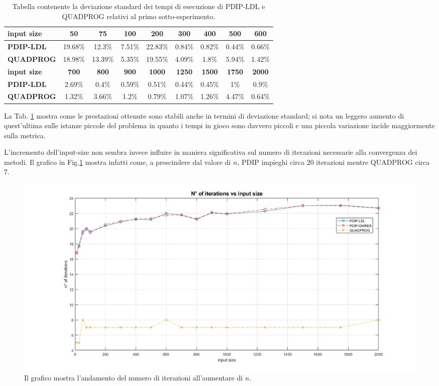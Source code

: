     
\begin{table}[!h]
\centering
\begin{tabular}{|l|c|c|c|c|c|c|c|c|}\hline
\textbf{input size} & \textbf{50}  & \textbf{75}  & \textbf{100} & \textbf{200}  & \textbf{300}  & \textbf{400}  & \textbf{500}  & \textbf{600}  \\\hline
\textbf{PDIP-LDL}   & 19.68\%      & 12.3\%      & 7.51\%      & 22.83\%        & 0.84\%        & 0.82\%        & 0.44\%        & 0.66\%        \\
\textbf{QUADPROG}   & 18.98\%      & 13.39\%      & 5.35\%      & 19.55\%        & 4.09\%        & 1.8\%        & 5.94\%       & 1.42\%        \\\hline
\textbf{input size} & \textbf{700} & \textbf{800} & \textbf{900} & \textbf{1000} & \textbf{1250} & \textbf{1500} & \textbf{1750} & \textbf{2000} \\\hline
\textbf{PDIP-LDL}   & 2.69\%       & 0.4\%       & 0.59\%       & 0.51\%        & 0.44\%        & 0.45\%        & 1\%        & 0.9\%        \\
\textbf{QUADPROG}   & 1.32\%       & 3.66\%       & 1.2\%       & 0.79\%        & 1.07\%        & 1.26\%        & 4.47\%        & 0.64\%     \\  \hline
\end{tabular}
    \caption{Tabella contenente la deviazione standard dei tempi di esecuzione di PDIP-LDL e QUADPROG relativi al primo sotto-esperimento. \label{tab:ldlqp1.1}}
\end{table}

La Tab. \ref{tab:ldlqp1.1} mostra come le prestazioni ottenute sono stabili anche in termini di deviazione standard; si nota un leggero aumento di quest'ultima sulle istanze piccole del problema in quanto i tempi in gioco sono davvero piccoli e una piccola variazione incide maggiormente sulla metrica.

L'incremento dell'input-size non sembra invece influire in maniera significativa sul  numero di iterazioni necessarie alla convergenza dei metodi.
Il grafico in Fig.\ref{fig:exp1.2} mostra infatti come, a prescindere dal valore di $n$, PDIP impieghi circa 20 iterazioni mentre QUADPROG circa 7.

\begin{figure}[!h]
    \centering
    \includegraphics[width=\textwidth]{img/MU7.png}
    \caption{Il grafico mostra l'andamento del numero di iterazioni all'aumentare di $n$. \label{fig:exp1.2}}
\end{figure}


